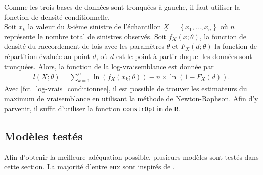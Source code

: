 	Comme les trois bases de données sont tronquées à gauche, il faut utiliser la fonction de densité conditionnelle.\\
	
	Soit $x_k$ la valeur du $k$-ième sinistre de l'échantillon $ \underline{X} = \left\{ x_1,\dots,x_n \right\}$ où $n$ représente le nombre total de sinistres observés. Soit $f_X(x;\underline{\theta})$, la fonction de densité du raccordement de lois avec les paramètres $\underline{\theta}$ et $F_X(d;\underline{\theta})$ la fonction de répartition évaluée au point $d$, où $d$ est le point à partir duquel les données sont tronquées. Alors, la fonction de la log-vraisemblance est donnée par
	\begin{align}\label{fct_log-vrais_conditionnee}
	l(\underline{X};\underline{\theta}) = \sum_{k=1}^{n} \ln( f_X(x_k;\underline{\theta})) - n \times \ln(1-F_X(d)).
	\end{align}
	Avec \ref{fct_log-vrais_conditionnee}, il est possible de trouver les estimateurs du maximum de vraisemblance en utilisant la méthode de Newton-Raphson. Afin d'y parvenir, il suffit d'utiliser la fonction \texttt{constrOptim} de \texttt{R}.	
	\subsection{Modèles testés}
	Afin d'obtenir la meilleure adéquation possible, plusieurs modèles sont testés dans cette section. La majorité d'entre eux sont inspirés de \cite{brazauskas2016modeling}.
	
